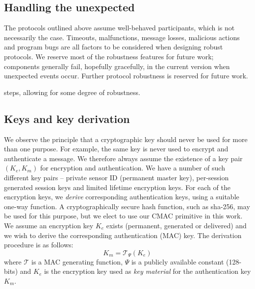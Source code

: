 \subsection{Handling the unexpected}

The protocols outlined above assume well-behaved participants, which is
not necessarily the case. Timeouts, malfunctions, message losses,
malicious actions and program bugs are all factors to be considered
when designing robust protocols. We reserve most of the robustness
features for future work; components generally fail, hopefully
gracefully, in the current version when unexpected events
occur. Further protocol robustness is reserved for future work.

steps, allowing for some degree of robustness.

\subsection{Keys and key derivation}
\label{sec:key-derivation}

We observe the principle that a cryptographic key should never be used for more than one purpose. For example, the same key is never used to encrypt and authenticate a message. We therefore always assume the existence of a key pair $(K_e,K_m)$ for encryption and authentication.
%
We have a number of such different key pairs -- private sensor ID (permanent master key), per-session generated session keys and limited lifetime encryption keys. For each of the encryption keys, we \textit{derive} corresponding authentication keys, using a suitable one-way function. A cryptographically secure hash function, such as sha-256, may be used for this purpose, but we elect to use our CMAC primitive in this work. We assume an encryption key $K_e$ exists (permanent, generated or delivered) and we wish to derive the corresponding authentication (MAC) key. The derivation procedure is as follows:
%
\[
K_m = \mathcal{T}_\Psi(K_e)
\]
%
where $\mathcal{T}$ is a MAC generating function, $\Psi$ is a publicly available constant (128-bits) and $K_e$ is the encryption key used as \textit{key material} for the authentication key $K_m$. 

